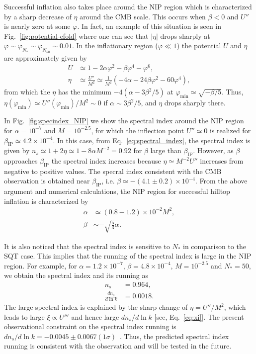 \documentclass[11pt,a4paper]{article}
\begin{document}
Successful inflation also takes place around the NIP region which is characterized by  a sharp decrease of $\eta $ around the CMB scale. 
This occurs when $\beta < 0$ and $U''$ is nearly zero at some $\varphi$.
In fact, an example of this situation is seen in Fig.~\ref{fig:potential-efold} where one can see that $|\eta|$ drops sharply at $\varphi \sim \varphi_{N_*}\sim \varphi_{N_{50}} \sim 0.01$.
In the inflationary region ($\varphi \ll 1$) the potential $U$ and $\eta$ are approximately given by 
\begin{align}
    U & \simeq 1-2\alpha \varphi^2 -\beta\varphi^4 -\varphi^6 ,\\
    \eta & \simeq \frac{U''}{M^2}\simeq \frac{1}{M^2}
         \left(-4\alpha -24\beta \varphi^2 -60\varphi^4\right),
\end{align}
from which the $\eta$ has the minimum  $-4(\alpha - 3\beta^2/5)$ at $\varphi_\mathrm{min} \simeq \sqrt{-\beta/5}$.
Thus, $\eta(\varphi_\mathrm{min}) \simeq U''(\varphi_\mathrm{min})/M^2\sim  0$ if $\alpha \sim 3\beta^2/5$, and $\eta$ drops sharply there. 

In Fig.~\ref{fig:specindex_NIP} we show the spectral index around the NIP region for $\alpha = 10^{-7}$ and $M=10^{-2.5}$, for which the inflection point $U''\simeq 0$ is realized for $\beta_\mathrm{IP} \simeq 4.2\times 10^{-4}$.
In this case, from Eq.~\eqref{eq:spectral_index}, the spectral index is given by $n_s \simeq 1+2\eta \simeq 1-8\alpha M^{-2} = 0.92$ for $\beta$ large than $\beta_\mathrm{IP}$.
However, as $\beta$  approaches $\beta_\mathrm{IP}$ the spectral index increases because $\eta \simeq M^{-2}U''$ increases from negative to positive values.
The specral index consistent with the CMB observation is obtained near $\beta_\mathrm{IP}$, i.e. $\beta\simeq -(4.1\pm 0.2)\times 10^{-4}$.
From the above argument and numerical calculations, the NIP region for successful hilltop inflation is characterized by
\begin{align}
    \alpha & \simeq (0.8-1.2)\times 10^{-2}M^2 ,\\
    \beta & \sim -\sqrt{\frac{5}{3}\alpha} .
\end{align}

It is also noticed that the spectral index is sensitive to $N_*$ in comparison to the SQT case.
This implies that the running of the spectral index is large in the NIP region.
For example, for $\alpha=1.2\times 10^{-7}$, $\beta=4.8\times 10^{-4}$, $M=10^{-2.5}$ and $N_*=50$, we obtain the spectral index and its running as
\begin{align}
    n_s & = 0.964 , \\
    \frac{dn_s}{d\ln k} & = 0.0018 .
\end{align}
The large spectral index is explained by the sharp change of $\eta =U''/M^2$, which leads to large $\xi \propto U'''$ and hence large $dn_s/d\ln k$ [see, Eq.~\eqref{eq:xi}].
The present observational constraint on the spectral index running is $dn_s/d\ln k = -0.0045\pm 0.0067 (1\sigma)$~\cite{Planck:2018jri}.
Thus, the predicted spectral index running is consistent with the observation and will be tested in the future. 
\end{document}
